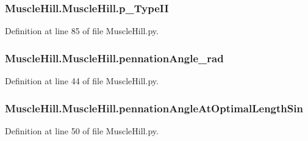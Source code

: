 \subsubsection[{\texorpdfstring{p\+\_\+\+Type\+II}{p_TypeII}}]{\setlength{\rightskip}{0pt plus 5cm}Muscle\+Hill.\+Muscle\+Hill.\+p\+\_\+\+Type\+II}\hypertarget{class_muscle_hill_1_1_muscle_hill_a6f4b5ceaea19db29f7cd1b98e3750624}{}\label{class_muscle_hill_1_1_muscle_hill_a6f4b5ceaea19db29f7cd1b98e3750624}


Definition at line 85 of file Muscle\+Hill.\+py.

\subsubsection[{\texorpdfstring{pennation\+Angle\+\_\+rad}{pennationAngle_rad}}]{\setlength{\rightskip}{0pt plus 5cm}Muscle\+Hill.\+Muscle\+Hill.\+pennation\+Angle\+\_\+rad}\hypertarget{class_muscle_hill_1_1_muscle_hill_ae1b3664f0f24c6859d437afcb69dab5f}{}\label{class_muscle_hill_1_1_muscle_hill_ae1b3664f0f24c6859d437afcb69dab5f}


Definition at line 44 of file Muscle\+Hill.\+py.

\subsubsection[{\texorpdfstring{pennation\+Angle\+At\+Optimal\+Length\+Sin}{pennationAngleAtOptimalLengthSin}}]{\setlength{\rightskip}{0pt plus 5cm}Muscle\+Hill.\+Muscle\+Hill.\+pennation\+Angle\+At\+Optimal\+Length\+Sin}\hypertarget{class_muscle_hill_1_1_muscle_hill_a22986f7a2c23975ebeffe7b8c3679187}{}\label{class_muscle_hill_1_1_muscle_hill_a22986f7a2c23975ebeffe7b8c3679187}


Definition at line 50 of file Muscle\+Hill.\+py.

